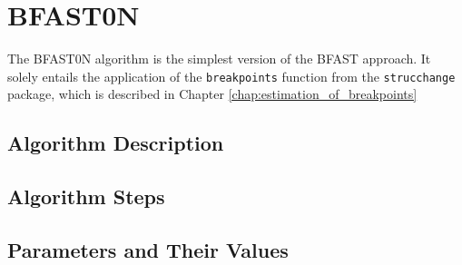 \documentclass[main.tex]{subfiles}
\begin{document}
\chapter{BFAST0N}
\label{chap:bfast0n}
The BFAST0N algorithm is the simplest version of the BFAST approach. It solely entails
the application of the \texttt{breakpoints} function from the
\texttt{strucchange} package, which is described in Chapter \ref{chap:estimation_of_breakpoints}
\section{Algorithm Description}
\label{sec:bfast0n_desc}
\section{Algorithm Steps}
\label{sec:algorithm_steps}
\section{Parameters and Their Values}
\label{sec:bfast0n_params}

\biblio
\end{document}
